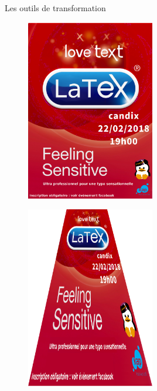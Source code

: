 \begin{frame}{Les outils de transformation}
\begin{overprint}
\begin{enumerate}
{				\begin{minipage}{0.45\textwidth}
				\begin{figure}
				    	\centering
				    	\includegraphics[width=0.5\textwidth]{Images/FullTex.png}
				\end{figure}
				\end{minipage}\hfill
				\begin{minipage}{0.45\textwidth}
				\begin{figure}
				    	\centering
				    	\includegraphics[width=0.5\textwidth]{Images/Perspective.png}
				\end{figure}
				\end{minipage}
		}

\end{enumerate}
\end{overprint}
\end{frame}
